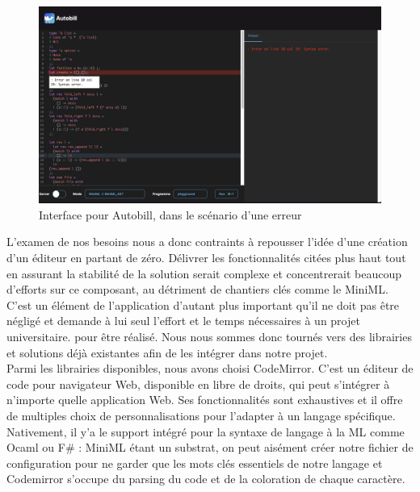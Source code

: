 \documentclass[12pt]{article}
\begin{document}
\begin{figure}
  \centering
  \includegraphics[scale=0.36]{Figures/screen.png}
  \caption{Interface pour Autobill, dans le scénario d'une erreur}
\end{figure}
L'examen de nos besoins nous a donc contraints à repousser l'idée d'une création d'un éditeur en partant de zéro. Délivrer les fonctionnalités citées plus haut tout en assurant la stabilité de la solution serait complexe et concentrerait beaucoup d'efforts sur ce composant, au détriment de chantiers clés comme le MiniML. C'est un élément de l'application d'autant plus important qu'il ne doit pas être négligé et demande à lui seul l'effort et le temps nécessaires à un projet universitaire. pour être réalisé. Nous nous sommes donc tournés vers des librairies et solutions déjà existantes afin de les intégrer dans notre projet. \\ 

Parmi les librairies disponibles, nous avons choisi CodeMirror. C'est un éditeur de code pour navigateur Web, disponible en libre de droits, qui peut s'intégrer à n'importe quelle application Web. Ses fonctionnalités sont exhaustives et il offre de multiples choix de personnalisations pour l'adapter à un langage spécifique. Nativement, il y'a le support intégré pour la syntaxe de langage à la ML comme Ocaml ou F\# : MiniML étant un substrat, on peut aisément créer notre fichier de configuration pour ne garder que les mots clés essentiels de notre langage et Codemirror s'occupe du parsing du code et de la coloration de chaque caractère. \\ 
\end{document}
